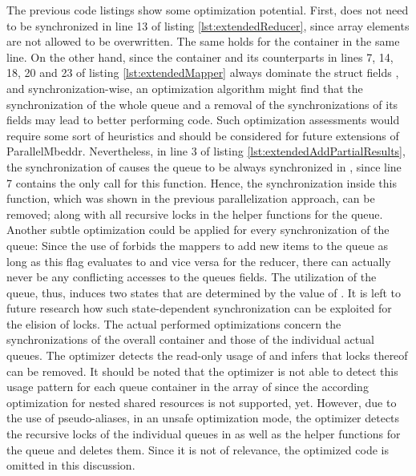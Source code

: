 The previous code listings show some optimization potential. First,  does not need to be synchronized in line 13 of listing \ref{lst:extendedReducer}, since array elements are not allowed to be overwritten. The same holds for the container  in the same line. On the other hand, since the container  and its counterparts in lines 7, 14, 18, 20 and 23 of listing \ref{lst:extendedMapper} always dominate the struct fields ,  and  synchronization-wise, an optimization algorithm might find that the synchronization of the whole queue and a removal of the synchronizations of its fields may lead to better performing code. Such optimization assessments would require some sort of heuristics and should be considered for future extensions of ParallelMbeddr. Nevertheless, in line 3 of listing \ref{lst:extendedAddPartialResults}, the synchronization of  causes the queue to be always synchronized in , since line 7 contains the only call for this function. Hence, the synchronization inside this function, which was shown in the previous parallelization approach, can be removed; along with all recursive locks in the helper functions for the queue. Another subtle optimization could be applied for every synchronization of the queue: Since the use of  forbids the mappers to add new items to the queue as long as this flag evaluates to  and vice versa for the reducer, there can actually never be any conflicting accesses to the queues fields. The utilization of the queue, thus, induces two states that are determined by the value of . It is left to future research how such state-dependent synchronization can be exploited for the elision of locks. The actual performed optimizations concern the synchronizations of the overall  container and those of the individual actual queues. The optimizer detects the read-only usage of  and infers that locks thereof can be removed. It should be noted that the optimizer is not able to detect this usage pattern for each queue container in the array of  since the according optimization for nested shared resources is not supported, yet. However, due to the use of pseudo-aliases, in an unsafe optimization mode, the optimizer detects the recursive locks of the individual queues in  as well as the helper functions for the queue and deletes them. Since it is not of relevance, the optimized code is omitted in this discussion.

